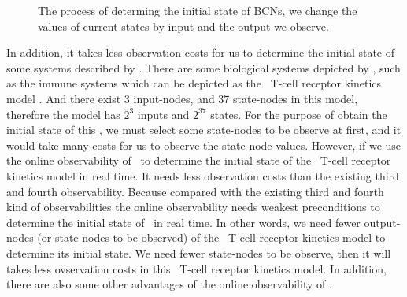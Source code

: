 \begin{figure}[thpb]
      \centering
      
      \caption{The process of determing the initial state of BCNs, we change the values of current states by input and the output we observe. }
      \label{fig:5}
   \end{figure}
In addition, it takes less observation costs for us to determine the initial state of some systems described by \BCNs. There are some biological systems depicted by \BCNs, such as the immune systems which can be depicted as the \BCN\ T-cell receptor kinetics model \cite{Klamt2006A}. And there exist $3$ input-nodes, and $37$ state-nodes in this model, therefore the model has $2^3$ inputs and $2^{37}$ states. For the purpose of obtain the initial state of this \BCN, we must select some state-nodes to be observe at first, and it would take many costs for us to observe the state-node values. However, if we use the online observability of \BCNs\ to determine the initial state of the \BCN\ T-cell receptor kinetics model in real time. It needs less observation costs than the existing third and fourth observability. Because compared with the existing third and fourth kind of observabilities the online observability needs weakest preconditions to determine the initial state of \BCNs\ in real time. In other words, we need fewer output-nodes (or state nodes to be observed) of the \BCN\ T-cell receptor kinetics model to determine its initial state. We need fewer state-nodes to be observe, then it will takes less ovservation costs in this \BCN\ T-cell receptor kinetics model. In addition, there are also some other advantages of the online observability of \BCNs.

